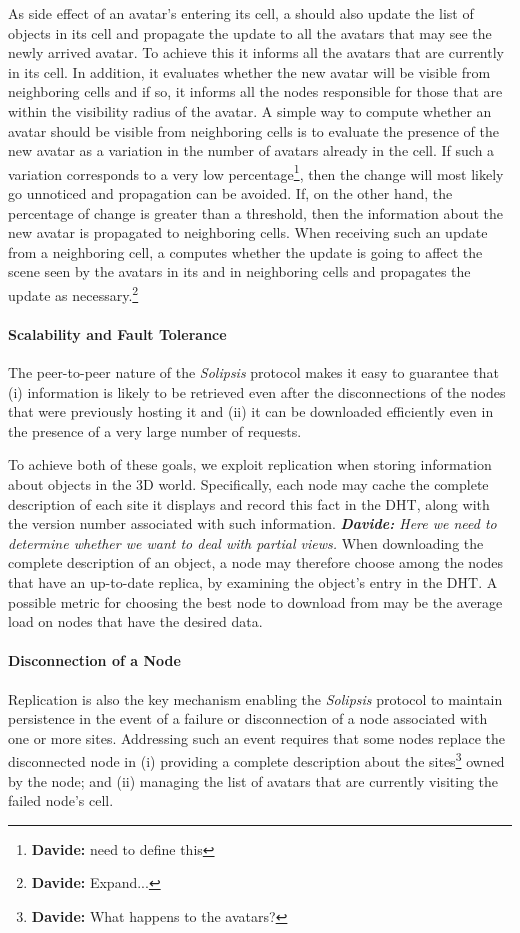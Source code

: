 \documentclass{article}
\newcommand{\df}[1]{\footnote{\textbf{Davide: }#1}}
\newcommand{\inlinedf}[1]{\textit{\textbf{Davide:} #1}}
\newcommand{\sol}{\emph{Solipsis}\xspace}
\begin{document}
As side effect of an avatar's entering its cell, a \snode should also
update the list of objects in its cell and propagate the update to all
the avatars that may see the newly arrived avatar. To achieve this it
informs all the avatars that are currently in its cell. In addition,
it evaluates whether the new avatar will be visible from neighboring
cells and if so, it informs all the nodes responsible for those that
are within the visibility radius of the avatar. A simple way to
compute whether an avatar should be visible from neighboring cells is
to evaluate the presence of the new avatar as a variation in the
number of avatars already in the cell. If such a variation corresponds
to a very low percentage\df{need to define this}, then the change will
most likely go unnoticed and propagation can be avoided. If, on the
other hand, the percentage of change is greater than a threshold, then
the information about the new avatar is propagated to neighboring
cells.  When receiving such an update from a neighboring cell, a
\snode computes whether the update is going to affect the scene seen
by the avatars in its and in neighboring cells and propagates the
update as necessary.\df{Expand...}


\paragraph{Scalability and Fault Tolerance}
The peer-to-peer nature of the \sol protocol makes it easy to
guarantee that (i) information is likely to be retrieved even after
the disconnections of the nodes that were previously hosting it and
(ii) it can be downloaded efficiently even in the presence of a very
large number of requests.

To achieve both of these goals, we exploit replication when storing
information about objects in the 3D world. Specifically, each node may
cache the complete description of each site it displays and record
this fact in the DHT, along with the version number associated with
such information.  \inlinedf{ Here we need to determine whether we
  want to deal with partial views.  }  When downloading the complete
description of an object, a node may therefore choose among the nodes
that have an up-to-date replica, by examining the object's entry in
the DHT.  A possible metric for choosing the best node to download
from may be the average load on nodes that have the desired data.




\paragraph{Disconnection of a Node}
Replication is also the key mechanism enabling the \sol protocol to
maintain persistence in the event of a failure or disconnection of a
node associated with one or more sites. Addressing such an event
requires that some nodes replace the disconnected node in (i)
providing a complete description about the sites\df{What happens to
  the avatars?}  owned by the node; and (ii) managing the list of
avatars that are currently visiting the failed node's cell.
\end{document}
